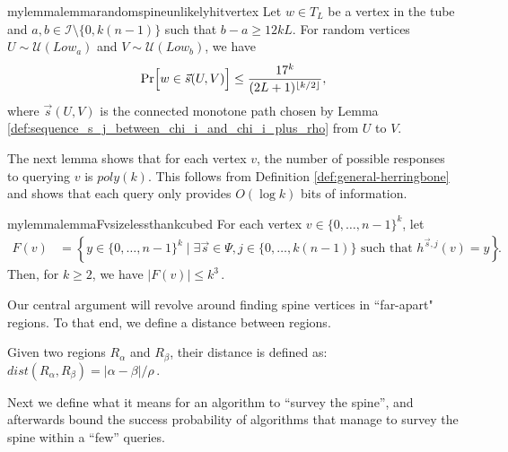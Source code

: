 \documentclass[11pt]{article}
\begin{document}
\begin{restatable}{mylemma}{lemmarandomspineunlikelyhitvertex}
\label{lem:random-spine-unlikely-to-hit-vertex}
Let $w \in T_L$ be a vertex in the tube and %
    $a,b \in \mathcal{I} \setminus \{0, k(n-1)\}$ such that 
     $b - a \geq 12kL$.  
    For random vertices $U \sim \mathcal{U}(Low_a)$ and $V \sim \mathcal{U}(Low_b)$, we have
\begin{equation} \label{eq:w_hits_sequence_s}
        \Pr \Bigl[ w \in \vec{s}(U, V) \Bigr] \leq \frac{17^k}{(2L+1)^{\lfloor k/2 \rfloor}},
    \end{equation} 
    where $\vec{s}(U, V)$ is the connected monotone path chosen by Lemma \ref{def:sequence_s_j_between_chi_i_and_chi_i_plus_rho} from $U$ to $V$.
\end{restatable}

The next lemma shows that for each vertex $v$, the number of possible responses to querying $v$ is $poly(k)$. This follows from Definition \ref{def:general-herringbone} and shows that each query only provides $O(\log k)$ bits of information.

\begin{restatable}{mylemma}{lemmaFvsizelessthankcubed}
\label{lem:F-v-size-less-than-k-cubed}
    For each vertex $v \in \{0, \ldots, n-1\}^k$, let
    \begin{align}
        F(v) &= \left\{y \in \{0, \ldots, n-1\}^k \mid \exists \vec{s} \in \Psi, j \in \{0, \ldots, k(n-1)\} \mbox{ such that } h^{\vec{s}, j}(v) = y\right\} \,. 
    \end{align}
    Then, for $k \geq 2$, we have 
$        |F(v)| \leq k^3\,.$
\end{restatable}

Our central argument will revolve around finding spine vertices in ``far-apart" regions. To that end, we define a distance between regions.

\begin{definition}
    Given two regions $R_{\alpha}$ and $R_{\beta}$, their distance is defined as:
    $        dist(R_{\alpha}, R_{\beta}) = |\alpha-\beta|/\rho \,.$
\end{definition}

Next we define what it means for an algorithm to ``survey the spine'', and afterwards bound the success probability of algorithms that manage to survey the spine within a ``few'' queries.
\end{document}
